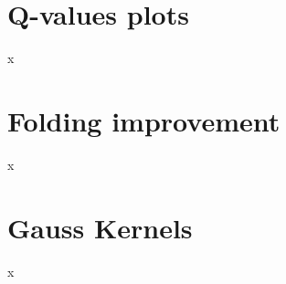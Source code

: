 \documentclass[landscape]{sciposter}
\begin{document}
\begin{multicols}{3}

\section*{Q-values plots}
x
\columnbreak

\section*{Folding improvement}
x
\columnbreak

\section*{Gauss Kernels}
x
\columnbreak
\end{multicols}



%
%



% 


%
%
 
\end{document}
